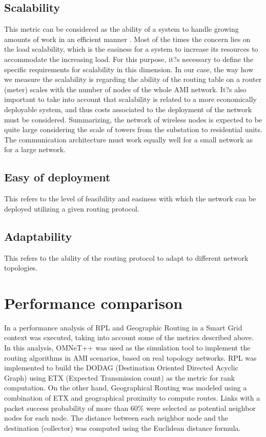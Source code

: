 \documentclass[11pt,final,onecolumn]{IEEEtran}
\begin{document}
\subsection{Scalability}
This metric can be considered as the ability of a system to handle growing amounts of work in an efficient manner \cite{Zhou2012}. Most of the times the concern lies on the load scalability, which is the easiness for a system to increase its resources to accommodate the increasing load. For this purpose, it?s necessary to define the specific requirements for scalability in this dimension. In our case, the way how we measure the scalability is regarding the ability of the routing table on a router (meter) scales with the number of nodes of the whole AMI network. It?s also important to take into account that scalability is related to a more economically deployable system, and thus costs associated to the deployment of the network must be considered. Summarizing, the network of wireless nodes is expected to be quite large considering the scale of towers from the substation to residential units. The communication architecture must work equally well for a small network as for a large network.


\subsection{Easy of deployment}
This refers to the level of feasibility and easiness with which the network can be deployed utilizing a given routing protocol.  

\subsection{Adaptability}
This refers to the ability of the routing protocol to adapt to different network topologies. 

\section{Performance comparison}

In \cite{Iyer2011a} a performance analysis of RPL and Geographic Routing in a Smart Grid context was executed, taking into account some of the metrics described above. In this analysis,  OMNeT++ was used as the simulation tool to implement the routing algorithms in AMI scenarios, based on real topology networks. RPL was implemented to build the DODAG (Destination Oriented Directed Acyclic Graph) using ETX (Expected Transmission count) as the metric for rank computation. On the other hand, Geographical Routing was modeled using a combination of ETX and geographical proximity to compute routes. Links with a packet success probability of more than 60\% were selected as potential neighbor nodes for each node. The distance between each neighbor node and the destination (collector) was computed using the Euclidean distance formula.  
\end{document}
